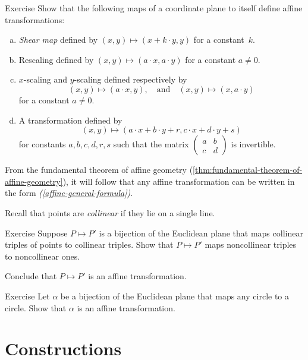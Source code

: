 \begin{thm}{Exercise}\label{ex:afine-linear}
Show that the following maps of a coordinate plane to itself define affine transformations:
\begin{enumerate}[(a)]
\item\label{ex:afine-linear:shear} \emph{Shear map} defined by $(x,y)\mapsto (x+k\cdot y,y)$ for a constant~$k$.
\item\label{ex:afine-linear:scaling}
Rescaling defined by $(x,y)\mapsto (a\cdot x,a\cdot y)$ for a constant $a\ne 0$.
\item $x$-scaling and $y$-scaling defined respectively by 
\[(x,y)\mapsto (a\cdot x,y),\quad\text{and}\quad(x,y)\mapsto (x,a\cdot y)\]
for a constant $a\ne 0$.
\item\label{affine-general-formula} A transformation defined by
\[(x,y)\mapsto(a\cdot x+b\cdot y+r,c\cdot x+d\cdot y+s)\]
for constants $a,b,c,d,r,s$ such that the matrix $(\begin{smallmatrix}a&b\\c&d\end{smallmatrix})$ is invertible. 
\end{enumerate}
\end{thm}

From the fundamental theorem of affine geometry (\ref{thm:fundamental-theorem-of-affine-geometry}), it will follow that any affine transformation can be written in the form \textit{(\ref{affine-general-formula})}.

Recall that points are \emph{collinear} if they lie on a single line.

\begin{thm}{Exercise}\label{ex:collinear=affine}
Suppose $P\mapsto P'$ is a bijection of the Euclidean plane that maps collinear triples of points to collinear triples.
Show that $P\mapsto P'$ maps noncollinear triples to noncollinear ones.

Conclude that $P\mapsto P'$ is an affine transformation.
\end{thm}

\begin{thm}{Exercise}\label{ex:circle=affine}
Let $\alpha$ be a bijection of the Euclidean plane that maps any circle to a circle.
Show that $\alpha$ is an affine transformation.
\end{thm}

\section{Constructions}

